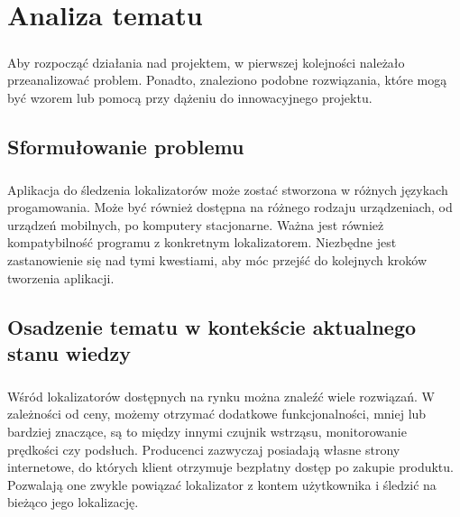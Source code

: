 \chapter{Analiza tematu}

\paragraph{}
Aby rozpocząć działania nad projektem, w pierwszej kolejności należało przeanalizować problem. Ponadto, znaleziono podobne rozwiązania, które mogą być wzorem lub pomocą przy dążeniu do innowacyjnego  projektu.

\section{Sformułowanie problemu}

\paragraph{}
Aplikacja do śledzenia lokalizatorów może zostać stworzona w różnych językach progamowania. Może być również dostępna na różnego rodzaju urządzeniach, od urządzeń mobilnych, po komputery stacjonarne. Ważna jest również kompatybilność programu z konkretnym lokalizatorem. Niezbędne jest zastanowienie się nad tymi kwestiami, aby móc przejść do kolejnych kroków tworzenia aplikacji.

\section{Osadzenie tematu w kontekście aktualnego stanu wiedzy}

\paragraph{}
Wśród lokalizatorów dostępnych na rynku można znaleźć wiele rozwiązań. W zależności od ceny, możemy otrzymać dodatkowe funkcjonalności, mniej lub bardziej znaczące, są to między innymi czujnik wstrząsu, monitorowanie prędkości czy podsłuch. Producenci zazwyczaj posiadają własne strony internetowe, do których klient otrzymuje bezpłatny dostęp po zakupie produktu. Pozwalają one zwykle powiązać lokalizator z kontem użytkownika i śledzić na bieżąco jego lokalizację.

